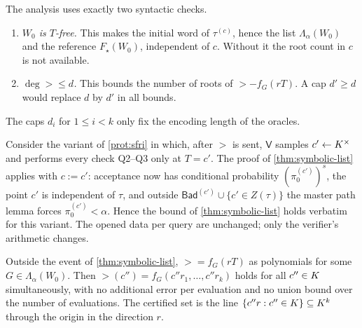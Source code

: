 \begin{remark}\label{rem:degree-checks}
The analysis uses exactly two syntactic checks.
\begin{enumerate}[label=\textup{(\roman*)}]
\item \emph{$W_0$ is $T$-free.} This makes the initial word of $\tau^{(c)}$, hence the
list $\Lambda_\alpha(W_0)$ and the reference $F_\star(W_0)$, independent of $c$. Without
it the root count in $c$ is not available.
\item \emph{$\deg\gt\le d$.} This bounds the number of roots of $\gt-f_G(rT)$. A cap
$d'\ge d$ would replace $d$ by $d'$ in all bounds.
\end{enumerate}
The caps $d_i$ for $1\le i<k$ only fix the encoding length of the oracles.
\end{remark}

\begin{remark}\label{rem:single-point}
Consider the variant of \cref{prot:sfri} in which, after $\gt$ is sent, $\mathsf V$
samples $c'\leftarrow K^\times$ and performs every check Q2--Q3 only at $T=c'$. The proof
of \cref{thm:symbolic-list} applies with $c:=c'$: acceptance now has conditional
probability $(\pi^{(c')}_0)^s$, the point $c'$ is independent of $\tau$, and outside
$\mathsf{Bad}^{(c')}\cup\{c'\in Z(\tau)\}$ the master path lemma forces
$\pi^{(c')}_0<\alpha$. Hence the bound of \cref{thm:symbolic-list} holds verbatim for
this variant. The opened data per query are unchanged; only the verifier's arithmetic
changes.
\end{remark}

\begin{remark}\label{rem:reuse}
Outside the event of \cref{thm:symbolic-list}, $\gt=f_G(rT)$ as polynomials for some
$G\in\Lambda_\alpha(W_0)$. Then $\gt(c'')=f_G(c''r_1,\dots,c''r_k)$ holds for all
$c''\in K$ simultaneously, with no additional error per evaluation and no union bound
over the number of evaluations. The certified set is the line
$\{c''r:c''\in K\}\subseteq K^k$ through the origin in the direction $r$.
\end{remark}
